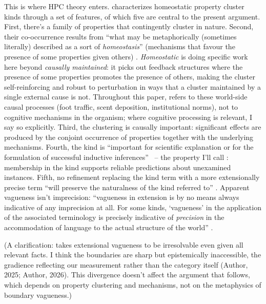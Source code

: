 \documentclass[12pt]{article}
\begin{document}
This is where HPC theory enters. \textcite[526--527]{boyd1993metaphor} characterizes homeostatic property cluster kinds through a set of features, of which five are central to the present argument. First, there's a family of properties that contingently cluster in nature. Second, their co-occurrence results from \enquote{what may be metaphorically (sometimes literally) described as a sort of \emph{homeostasis}} (mechanisms that favour the presence of some properties given others) \citep[526]{boyd1993metaphor}. \emph{Homeostatic} is doing specific work here beyond \emph{causally maintained}: it picks out feedback structures where the presence of some properties promotes the presence of others, making the cluster self-reinforcing and robust to perturbation in ways that a cluster maintained by a single external cause is not. Throughout this paper,  refers to these world-side causal processes (foot traffic, scent deposition, institutional norms), not to cognitive mechanisms in the organism; where cognitive processing is relevant, I say so explicitly. Third, the clustering is causally important: significant effects are produced by the conjoint occurrence of properties together with the underlying mechanisms. Fourth, the kind is \enquote{important for scientific explanation or for the formulation of successful inductive inferences} \citep[526]{boyd1993metaphor}~-- the property I'll call : membership in the kind supports reliable predictions about unexamined instances. Fifth, no refinement replacing the kind term with a more extensionally precise term \enquote{will preserve the naturalness of the kind referred to} \citep[526]{boyd1993metaphor}. Apparent vagueness isn't imprecision: \enquote{vagueness in extension is by no means always indicative of any imprecision at all. For some kinds, `vagueness' in the application of the associated terminology is precisely indicative of \emph{precision} in the accommodation of language to the actual structure of the world} \citep[530]{boyd1993metaphor}.

(A clarification: \textcite[527]{boyd1993metaphor} takes extensional vagueness to be irresolvable even given all relevant facts. I think the boundaries are sharp but epistemically inaccessible, the gradience reflecting our measurement rather than the category itself (Author, 2025; Author, 2026). This divergence doesn't affect the argument that follows, which depends on property clustering and mechanisms, not on the metaphysics of boundary vagueness.)
\end{document}
